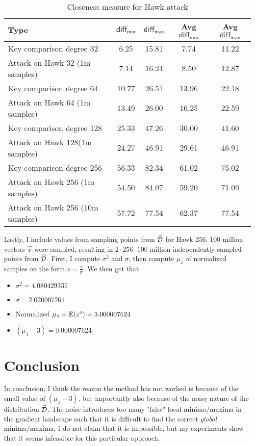 \begin{table}[H]
    \centering
    \caption{Closeness measure for Hawk attack}
    \begin{tabular}{lcccc}
        \toprule
        \textbf{Type} & $\mathsf{diff_{min}}$ & $\mathsf{diff_{max}}$ & \textbf{Avg $\mathsf{diff_{min}}$} & \textbf{Avg $\mathsf{diff_{max}}$} \\
        \midrule
        Key comparison degree 32 & 6.25 & 15.81 & 7.74 & 11.22 \\
        Attack on Hawk 32 (1m samples) & 7.14 & 16.24 & 8.50 & 12.87 \\
        \midrule
        Key comparison degree 64 & 10.77 & 26.51 & 13.96 & 22.18 \\
        Attack on Hawk 64 (1m samples) & 13.49 & 26.00 & 16.25 & 22.59 \\
        \midrule
        Key comparison degree 128 & 25.33 & 47.26 & 30.00 & 41.60 \\
        Attack on Hawk 128(1m samples) & 24.27 & 46.91 & 29.61 & 46.91 \\
        \midrule

        Key comparison degree 256 & 56.33 & 82.34 & 61.02 & 75.02 \\
        Attack on Hawk 256 (1m samples) & 54.50 & 84.07 & 59.20 & 71.09 \\ 
        Attack on Hawk 256 (10m samples) & 57.72 & 77.54 & 62.37 & 77.54 \\
        \bottomrule
    \end{tabular}
\end{table}
Lastly, I include values from sampling points from $\widehat{\mathcal{D}}$ for Hawk 256. 100 million vectors $\vec{x}$ were sampled, resulting in $2 \cdot 256 \cdot 100$ million independently sampled points from $\widehat{\mathcal{D}}$.
First, I compute $\sigma^2$ and $\sigma$, then compute $\mu_4$ of normalized samples on the form $z = \frac{x}{\sigma}$.
We then get that 
\begin{itemize}
    \item $\sigma^2 = 4.080429335$
    \item $\sigma = 2.020007261$
    \item Normalized $\mu_4 = \mathbb{E} (z^4) = 3.000007624$
    \item $(\mu_4 - 3) = 0.000007624$
\end{itemize}

\section{Conclusion}
In conclusion, I think the reason the method has not worked is because of the small value of $(\mu_4 - 3)$, but importantly also because of the noisy nature of the distribution $\widehat{\mathcal{D}}$. 
The noise introduces too many "false" local minima/maxima in the gradient landscape such that it is difficult to find the correct \textit{global} minima/maxima.
I do not claim that it is impossible, but my experiments show that it seems infeasible for this particular approach.
